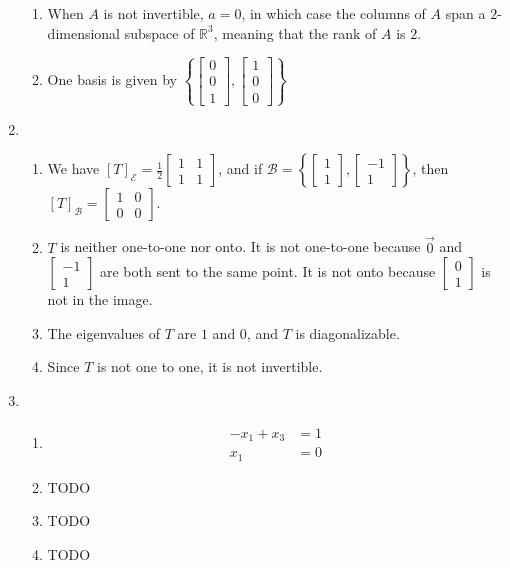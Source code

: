 \documentclass[red]{tutorial}
\newcommand{\R}{\mathbb{R}}
\newcommand{\mat}[1]{\begin{bmatrix} #1 %
\end{bmatrix}}
\newcommand{\smat}[1]{\left[\begin{smallmatrix} #1 %
\end{smallmatrix}\right]}
\theoremstyle{definition}
\theoremstyle{theorem}
\begin{document}
\begin{solutions}
\begin{enumerate}
\begin{enumerate}
        \item
          When $A$ is not invertible, $a=0$, in which case the columns of $A$
          span a $2$-dimensional subspace of $\R^3$, meaning that the rank of
          $A$ is $2$.
        \item
          One basis is given by $\left\{\mat{0\\0\\1} , \mat{1\\0\\0}\right\}$
      \end{enumerate}
    \item
      \begin{enumerate}
        \item
          We have
          $[T]_{\mathcal{E}} = \displaystyle\frac12\mat{1&1\\1&1}$,
          and if $\mathcal{B} = \left\{\mat{1\\1},\mat{-1\\1}\right\}$,
          then $[T]_{\mathcal{B}} = \mat{1&0\\0&0}$.
        \item $T$ is neither one-to-one nor onto. It is not 
          one-to-one because $\vec 0$ and $\smat{-1\\1}$ are both sent 
          to the same point. It is not onto because $\smat{0\\1}$ is not 
          in the image.
        \item The eigenvalues of $T$ are $1$ and $0$, 
          and $T$ is diagonalizable.
        \item Since $T$ is not one to one, it is not invertible.
      \end{enumerate}
    \item
      \begin{enumerate}
        \item
          \begin{align*}
            -x_1 + x_3 &= 1\\
            x_1 \phantom{{} + x_3}&= 0
          \end{align*}
        \item TODO
        \item TODO
        \item TODO
      \end{enumerate}
  \end{enumerate}
\end{solutions}
\end{document}
